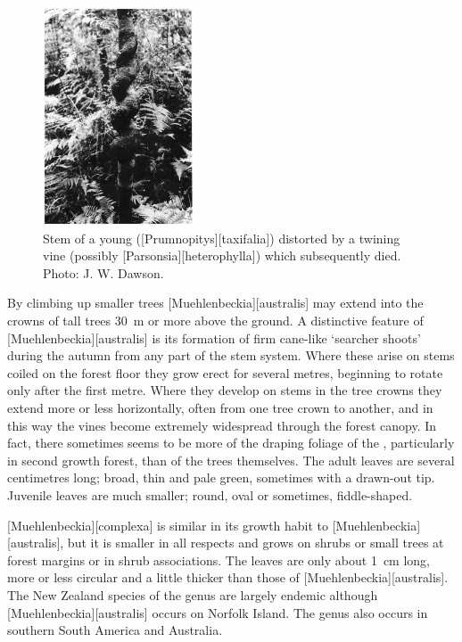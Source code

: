 \begin{figure}
	\includegraphics[width=0.4\textwidth]{graphics/figure35matai.jpg}
	\centering
	\caption[Stem of a young matai]{Stem of a young  ([Prumnopitys][taxifalia]) distorted by a twining vine (possibly [Parsonsia][heterophylla]) which subsequently died.
	Photo: J. W. Dawson.}%
	\label{fig:35matai}
\end{figure}

By climbing up smaller trees [Muehlenbeckia][australis] may extend into the crowns of tall trees \SI{30}{\metre} or more above the ground.
A distinctive feature of [Muehlenbeckia][australis] is its formation of firm cane-like `searcher shoots' during the autumn from any part of the stem system.
Where these arise on stems coiled on the forest floor they grow erect for several metres, beginning to rotate only after the first metre.
Where they develop on stems in the tree crowns they extend more or less horizontally, often from one tree crown to another, and in this way the vines become extremely widespread through the forest canopy.
In fact, there sometimes seems to be more of the draping foliage of the , particularly in second growth forest, than of the trees themselves.
The adult leaves are several centimetres long; broad, thin and pale green, sometimes with a drawn-out tip.
Juvenile leaves are much smaller; round, oval or sometimes, fiddle-shaped.

[Muehlenbeckia][complexa] is similar in its growth habit to [Muehlenbeckia][australis], but it is smaller in all respects and grows on shrubs or small trees at forest margins or in shrub associations.
The leaves are only about \SI{1}{\centi\metre} long, more or less circular and a little thicker than those of [Muehlenbeckia][australis].
The New Zealand species of the genus are largely endemic although [Muehlenbeckia][australis] occurs on Norfolk Island.
The genus also occurs in southern South America and Australia.

